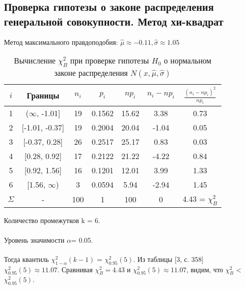 \documentclass[12pt,a4paper]{scrartcl}
\begin{document}
\subsection{Проверка гипотезы о законе распределения генеральной совокупности. Метод хи-квадрат}

	Метод максимального правдоподобия:
	\newline
	$\hat{\mu} \approx -0.11, \hat{\sigma} \approx 1.05$
	
	\begin{table}[H]
	    \centering
	    \begin{tabular}{| c | c | c | c | c | c | c |}
    \hline
  $ i$ & Границы          &   $n_i$ &   $ p_i$ &   $np_i$ &  $ n_i - np_i$ &  $ \frac{(n_i - np_i)^2}{np_i} $ \\
\hline
   1 & ($\infty$, -1.01] &    19 & 0.1562 &  15.62 &         3.38 &                          0.73 \\  \hline
   2 & [-1.01, -0.37]  &    19 & 0.2004 &  20.04 &        -1.04 &                          0.05 \\  \hline
   3 & [-0.37, 0.28]   &    26 & 0.2517 &  25.17 &         0.83 &                          0.03 \\  \hline
   4 & [0.28, 0.92]    &    17 & 0.2122 &  21.22 &        -4.22 &                          0.84 \\  \hline
   5 & [0.92, 1.56]    &    16 & 0.1201 &  12.01 &         3.99 &                          1.33 \\  \hline
   6 & [1.56, $\infty$)  &     3 & 0.0594 &   5.94 &        -2.94 &                          1.45 \\  \hline
  $ \Sigma $& -               &   100 & 1      & 100    &         0    & 4.43 = $\chi^{2}_B$ \\  \hline
\end{tabular}
	    \caption{ Вычисление $\chi^{2}_{B}$ при проверке гипотезы $H_{0}$ о нормальном законе распределения $N(x,\hat{\mu}, \hat{\sigma})$}
	    \label{tab:chi_2}
\end{table}
Количество промежутков k = 6.
    \\ \\
Уровень значимости $\alpha$= 0.05.
    \\ \\
    Тогда квантиль $\chi^{2}_{1-\alpha}(k-1)$ = $\chi^{2}_{0.95}(5)$. Из таблицы [3, с. 358] $\chi^{2}_{0.95}(5) \approx 11.07$. 
Сравнивая $\chi^{2}_{B} = 4.43$ и $\chi^{2}_{0.95}(5) \approx 11.07$, видим, что $\chi^{2}_{B}$ < $\chi^{2}_{0.95}(5)$.
\end{document}
